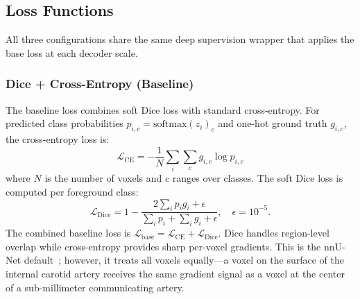 \documentclass[conference]{IEEEtran}
\begin{document}
\subsection{Loss Functions}

All three configurations share the same deep supervision wrapper that applies the base loss at each decoder scale.

\subsubsection{Dice + Cross-Entropy (Baseline)}
The baseline loss combines soft Dice loss with standard cross-entropy. For predicted class probabilities $p_{i,c} = \text{softmax}(z_i)_c$ and one-hot ground truth $g_{i,c}$, the cross-entropy loss is:
\begin{equation}
    \mathcal{L}_{\text{CE}} = -\frac{1}{N}\sum_{i} \sum_{c} g_{i,c} \log p_{i,c}
\end{equation}
where $N$ is the number of voxels and $c$ ranges over classes. The soft Dice loss is computed per foreground class:
\begin{equation}
    \mathcal{L}_{\text{Dice}} = 1 - \frac{2\sum_i p_i g_i + \epsilon}{\sum_i p_i + \sum_i g_i + \epsilon}, \quad \epsilon = 10^{-5}.
\end{equation}
The combined baseline loss is $\mathcal{L}_{\text{base}} = \mathcal{L}_{\text{CE}} + \mathcal{L}_{\text{Dice}}$. Dice handles region-level overlap while cross-entropy provides sharp per-voxel gradients. This is the nnU-Net default~\cite{isensee2024}; however, it treats all voxels equally---a voxel on the surface of the internal carotid artery receives the same gradient signal as a voxel at the center of a sub-millimeter communicating artery.
\end{document}
